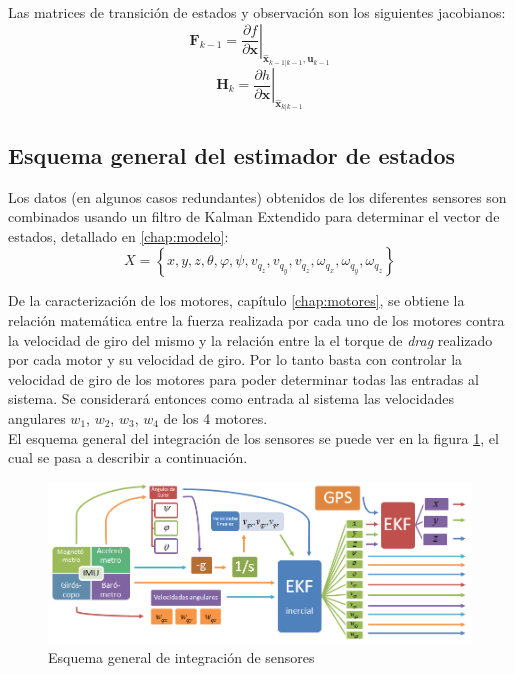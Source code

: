 \documentclass[main]{subfiles}
\begin{document}
Las matrices de transición de estados y observación son los siguientes jacobianos:
$$ { \mathbf{F}_{k-1}} = \left . \frac{\partial f}{\partial \mathbf{x} } \right \vert _{\hat{\mathbf{x}}_{k-1|k-1},\mathbf{u}_{k-1}} $$
\vspace{10pt}
$$ { \mathbf{H}_{k}} = \left . \frac{\partial h}{\partial \mathbf{x} } \right \vert _{\hat{\mathbf{x}}_{k|k-1}} $$


\subsection{Esquema general del estimador de estados}

Los datos (en algunos casos redundantes) obtenidos de los diferentes sensores son combinados usando un filtro de Kalman Extendido para determinar el vector de estados, detallado en \ref{chap:modelo}:
\begin{equation}
  \label{eq:estado}
  X=\left\lbrace  x,y,z, \theta,\varphi,\psi, v_{q_z},v_{q_y},v_{q_z},\omega_{q_x},\omega_{q_y},\omega_{q_z} \right\rbrace
\end{equation}

De la caracterización de los motores, capítulo \ref{chap:motores}, se obtiene la relación matemática entre la fuerza realizada por cada uno de los motores contra la velocidad de giro del mismo y la relación entre la el torque de \emph{drag} realizado por cada motor y su velocidad de giro. Por lo tanto basta con controlar la velocidad de giro de los motores para poder determinar todas las entradas al sistema. Se considerará entonces como entrada al sistema las velocidades angulares $w_1$, $w_2$, $w_3$, $w_4$ de los 4 motores.\\

El esquema general del integración de los sensores se puede ver en la figura \ref{fig:diagrama_kalman}, el cual se pasa a describir a continuación.

\begin{figure}[h!]
	\centering
	\includegraphics[width=1\textwidth]{./pics_kalman/diagrama_kalman.png}
	\caption{Esquema general de integración de sensores}
	\label{fig:diagrama_kalman}
\end{figure}
\end{document}
